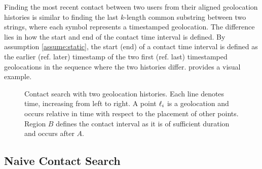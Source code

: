 Finding the most recent contact between two users from their aligned geolocation histories is similar to finding the last $k$-length common substring between two strings, where each symbol represents a timestamped geolocation. The difference lies in how the start and end of the contact time interval is defined. By assumption \ref{assume:static}, the start (end) of a contact time interval is defined as the earlier (ref. later) timestamp of the two first (ref. last) timestamped geolocations in the sequence where the two histories differ.  provides a visual example.

\begin{figure}[htbp]
\centering
{}
\caption[Contact search with two geolocation histories]{Contact search with two geolocation histories. Each line denotes time, increasing from left to right. A point $\ell_i$ is a geolocation and occurs relative in time with respect to the placement of other points. Region $B$ defines the contact interval as it is of sufficient duration and occurs after $A$.}
\label{fig:contact-search}
\end{figure}

\subsection{Naive Contact Search}\label{sec:naive-contact-search}

